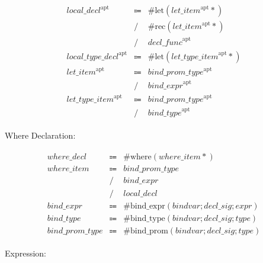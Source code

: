 \begin{align*}
    \begin{array}{rcll}
        \mathit{local\_decl}^\mathrm{apt}
        &\Coloneq &\mathrm{\#let}(\mathit{let\_item}^\mathrm{apt}{*}) \\
        &\mathrel{/} &\mathrm{\#rec}(\mathit{let\_item}^\mathrm{apt}{*}) \\
        &\mathrel{/} &\mathit{decl\_func}^\mathrm{apt} \\
        \mathit{local\_type\_decl}^\mathrm{apt}
        &\Coloneq &\mathrm{\#let}(\mathit{let\_type\_item}^\mathrm{apt}{*}) \\
        \mathit{let\_item}^\mathrm{apt}
        &\Coloneq &\mathit{bind\_prom\_type}^\mathrm{apt} \\
        &\mathrel{/} &\mathit{bind\_expr}^\mathrm{apt} \\
        \mathit{let\_type\_item}^\mathrm{apt}
        &\Coloneq &\mathit{bind\_prom\_type}^\mathrm{apt} \\
        &\mathrel{/} &\mathit{bind\_type}^\mathrm{apt}
    \end{array}
\end{align*}

Where Declaration:

\begin{align*}
    \begin{array}{rcll}
        \mathit{where\_decl}
        &\Coloneq &\mathrm{\#where}(\mathit{where\_item}{*}) \\
        \mathit{where\_item}
        &\Coloneq &\mathit{bind\_prom\_type} \\
        &\mathrel{/} &\mathit{bind\_expr} \\
        &\mathrel{/} &\mathit{local\_decl} \\
        \mathit{bind\_expr}
        &\Coloneq &\mathrm{\#bind\_expr}(\mathit{bindvar}; \mathit{decl\_sig}; \mathit{expr}) \\
        \mathit{bind\_type}
        &\Coloneq &\mathrm{\#bind\_type}(\mathit{bindvar}; \mathit{decl\_sig}; \mathit{type}) \\
        \mathit{bind\_prom\_type}
        &\Coloneq &\mathrm{\#bind\_prom}(\mathit{bindvar}; \mathit{decl\_sig}; \mathit{type})
    \end{array}
\end{align*}

Expression:

